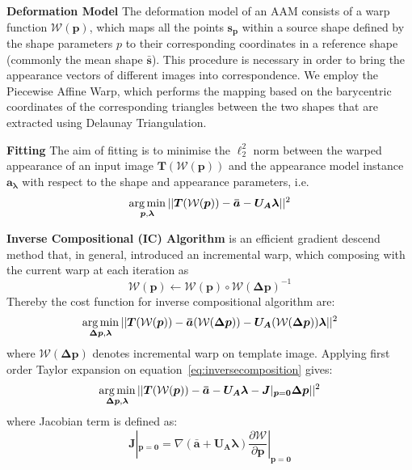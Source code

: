 \noindent\textbf{Deformation Model} The deformation model of an AAM consists of a warp function $\mathcal{W}(\bm{p})$, which maps all the points $\bm{s_p}$ within a source shape defined by the shape parameters $p$ to their corresponding coordinates in a reference shape (commonly the mean shape $\bm{\bar{s}}$). This procedure is necessary in order to bring the appearance vectors of different images into correspondence. We employ the Piecewise Affine Warp, which performs the mapping based on the barycentric coordinates of the corresponding triangles between the two shapes that are extracted using Delaunay Triangulation.

\noindent\textbf{Fitting}
The aim of fitting is to minimise the $\ell_2^2$ norm between the warped appearance of an input image $\bm{T}(\mathcal{W}(\bm{p}))$ and the appearance model instance $\bm{a_\lambda}$ with respect to the shape and appearance parameters, i.e. 
\begin{equation} 
\label{eq:aamfittingbase}
    \operatorname*{arg\,min}_{\bm{p}, \bm{\lambda}}||\bm{T}(\mathcal{W}(\bm{p}))-\bm{\bar{a}}-\bm{U_A}\bm{\lambda}||^2
\end{equation}



\noindent\textbf{Inverse Compositional (IC) Algorithm} is an efficient gradient descend method that, in general, introduced an incremental warp, which composing with the current warp at each iteration as
\begin{equation}
\label{eq:composition}
\mathcal{W}(\bm{p})\leftarrow\mathcal{W}(\bm{p})\circ\mathcal{W}(\bm{\Delta p})^{-1}
\end{equation}
Thereby the cost function for inverse compositional algorithm are:
\begin{equation}
\label{eq:inversecomposition}
\operatorname*{arg\,min}_{\bm{\Delta p}, \bm{\lambda}}||\bm{T}(\mathcal{W}(\bm{p}))-\bm{\bar{a}}(\mathcal{W}(\bm{\Delta p}))-\bm{U_A}(\mathcal{W}(\bm{\Delta p}))\bm{\lambda}||^2
\end{equation}
where $\mathcal{W}(\bm{\Delta p})$ denotes incremental warp on template image. 
Applying first order Taylor expansion on equation~\ref{eq:inversecomposition} gives:
\begin{equation}
\label{eq:forwardcompositiontaylor}
\operatorname*{arg\,min}_{\bm{\Delta p}, \bm{\lambda}}||\bm{T}(\mathcal{W}(\bm{p}))-\bm{\bar{a}}-\bm{U_A}\bm{\lambda}-\bm{J}|_{\bm{p}=\bm{0}}\bm{\Delta p}||^2
\end{equation}
where Jacobian term is defined as:
\begin{equation}
\label{eq:jacobian}
\bm{J}|_{\bm{p}=\bm{0}}=\nabla(\bm{\bar{a}}+\bm{U_A}\bm{\lambda})\frac{\partial \mathcal{W}}{\partial \bm{p}}|_{\bm{p}=\bm{0}}
\end{equation}




